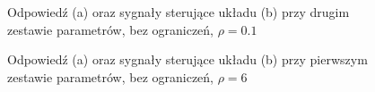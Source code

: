 \documentclass{article}
\begin{document}
\begin{figure}[H]
    \centering
    \caption{Odpowiedź (a) oraz sygnały sterujące układu (b) przy drugim zestawie parametrów, bez ograniczeń, $\rho=0.1$}
    \label{fig:2bez}
\end{figure}

\begin{figure}[H]
    \centering
    \caption{Odpowiedź (a) oraz sygnały sterujące układu (b) przy pierwszym zestawie parametrów, bez ograniczeń, $\rho=6$}
    \label{fig:3bez}
\end{figure}
\end{document}

